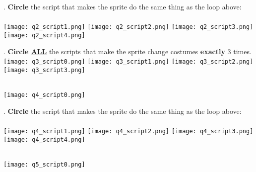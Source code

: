 . \textbf{Circle} the script that makes the sprite do the same thing as the loop above: \\ \\
\texttt{[image: q2\_script1.png]} \hspace{1.25cm}
\texttt{[image: q2\_script2.png]} \hspace{1.25cm}
\texttt{[image: q2\_script3.png]} \hspace{1.25cm}
\texttt{[image: q2\_script4.png]} \hspace{1.25cm} \\

\noindent \dotfill

. \textbf{Circle \underline{ALL}} the scripts that make the sprite change costumes \textbf{exactly} 3 times. \\

\texttt{[image: q3\_script0.png]} \hspace{1.5cm}
\texttt{[image: q3\_script1.png]} \hspace{1.5cm}
\texttt{[image: q3\_script2.png]} \hspace{1.5cm}
\texttt{[image: q3\_script3.png]} \hspace{1.5cm} \\


\noindent \dotfill \\

\begin{center}
\texttt{[image: q4\_script0.png]}
\end{center}

. \textbf{Circle} the script that makes the sprite do the same thing as the loop above: \\ \\
\texttt{[image: q4\_script1.png]} \hspace{1.25cm}
\texttt{[image: q4\_script2.png]} \hspace{1.25cm}
\texttt{[image: q4\_script3.png]} \hspace{1.25cm}
\texttt{[image: q4\_script4.png]} \hspace{1.25cm} \\

\noindent \dotfill \\

\begin{center}
\texttt{[image: q5\_script0.png]}
\end{center}

